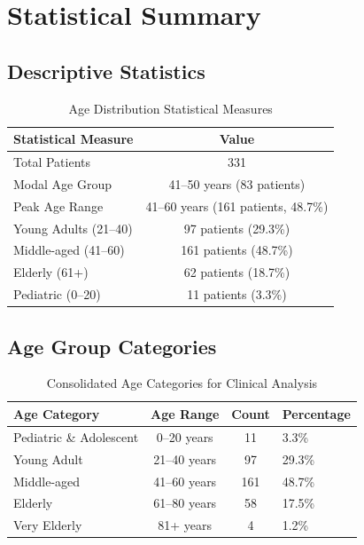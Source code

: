 \documentclass[10pt]{article}
\begin{document}
\section{Statistical Summary}

\subsection{Descriptive Statistics}

\begin{table}[h!]
\centering
\caption{Age Distribution Statistical Measures}
\begin{tabular}{l|c}
\toprule
\rowcolor{headercolor}
\textbf{Statistical Measure} & \textbf{Value} \\
\midrule
Total Patients & 331 \\
\rowcolor{altrowcolor}
Modal Age Group & 41--50 years (83 patients) \\
Peak Age Range & 41--60 years (161 patients, 48.7\%) \\
\rowcolor{altrowcolor}
Young Adults (21--40) & 97 patients (29.3\%) \\
Middle-aged (41--60) & 161 patients (48.7\%) \\
\rowcolor{altrowcolor}
Elderly (61+) & 62 patients (18.7\%) \\
Pediatric (0--20) & 11 patients (3.3\%) \\
\bottomrule
\end{tabular}
\end{table}

\subsection{Age Group Categories}

\begin{table}[h!]
\centering
\caption{Consolidated Age Categories for Clinical Analysis}
\begin{tabular}{l|c|c|l}
\toprule
\rowcolor{headercolor}
\textbf{Age Category} & \textbf{Age Range} & \textbf{Count} & \textbf{Percentage} \\
\midrule
Pediatric \& Adolescent & 0--20 years & 11 & 3.3\% \\
\rowcolor{altrowcolor}
Young Adult & 21--40 years & 97 & 29.3\% \\
Middle-aged & 41--60 years & 161 & 48.7\% \\
\rowcolor{altrowcolor}
Elderly & 61--80 years & 58 & 17.5\% \\
Very Elderly & 81+ years & 4 & 1.2\% \\
\bottomrule
\end{tabular}
\end{table}
\end{document}
